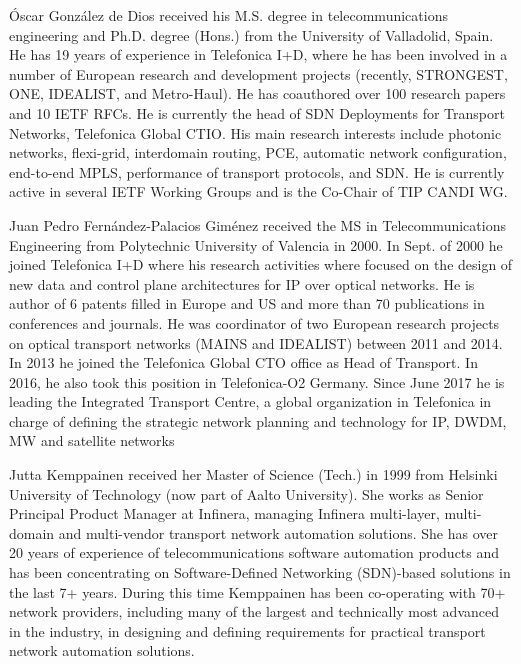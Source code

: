 \documentclass[a4paper,fleqn]{cas-dc}
\begin{document}
Óscar González de Dios received his M.S. degree in telecommunications engineering and Ph.D. degree (Hons.) from the University of Valladolid, Spain. He has 19 years of experience in Telefonica I+D, where he has been involved in a number of European research and development projects (recently, STRONGEST, ONE, IDEALIST, and Metro-Haul). He has coauthored over 100 research papers and 10 IETF RFCs. He is currently the head of SDN Deployments for Transport Networks, Telefonica Global CTIO. His main research interests include photonic networks, flexi-grid, interdomain routing, PCE, automatic network configuration, end-to-end MPLS, performance of transport protocols, and SDN. He is currently active in several IETF Working Groups and is the Co-Chair of TIP CANDI WG.
\endbio

Juan Pedro Fernández-Palacios Giménez received the MS in Telecommunications Engineering from Polytechnic University of Valencia in 2000. In Sept. of 2000 he joined Telefonica I+D where his research activities where focused on the design of new data and control plane architectures for IP over optical networks. He is author of 6 patents filled in Europe and US and more than 70 publications in conferences and journals. He was coordinator of two European research projects on optical transport networks (MAINS and IDEALIST) between 2011 and 2014. In 2013 he joined the Telefonica Global CTO office as Head of Transport. In 2016, he also took this position in Telefonica-O2 Germany. Since June 2017 he is leading the Integrated Transport Centre, a global organization in Telefonica in charge of defining the strategic network planning and technology for IP, DWDM, MW and satellite networks
\endbio

Jutta Kemppainen received her Master of Science (Tech.) in 1999 from Helsinki University of Technology (now part of Aalto University). She works as Senior Principal Product Manager at Infinera, managing Infinera multi-layer, multi-domain and multi-vendor transport network automation solutions. She has over 20 years of experience of telecommunications software automation products and has been concentrating on Software-Defined Networking (SDN)-based solutions in the last 7+ years. During this time Kemppainen has been co-operating with 70+ network providers, including many of the largest and technically most advanced in the industry, in designing and defining requirements for practical transport network automation solutions.
\endbio
\end{document}
